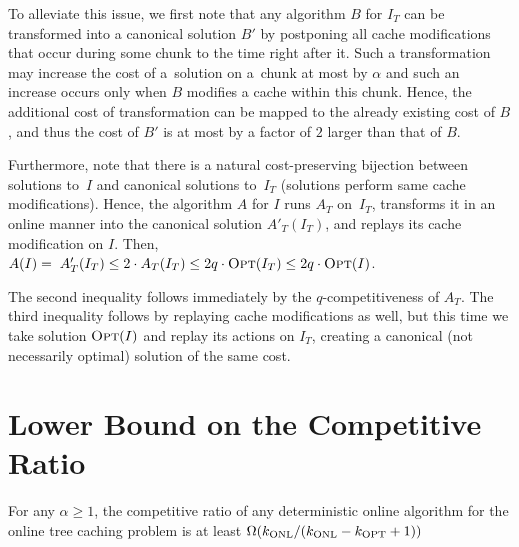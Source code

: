 To alleviate this issue, we first note that any algorithm $B$ for $I_T$ can be
transformed into a canonical solution $B'$ by postponing all cache modifications
that occur during some chunk to the time right after it. Such a transformation
may increase the cost of a~solution on a~chunk at most by $\alpha$ and such an
increase occurs only when $B$ modifies a cache within this chunk. Hence, the
additional cost of transformation can be mapped to the already existing cost of
$B$, and thus the cost of $B'$ is at most by a factor of $2$ larger than that
of $B$.

Furthermore, note that there is a natural cost-pre\-serv\-ing bijection
between solutions to~$I$ and canonical solutions to~$I_T$ (solutions perform
same cache modifications). Hence, the algorithm $A$ for $I$ runs $A_T$
on~$I_T$, transforms it in an online manner into the canonical solution $A'_T(I_T)$, 
and replays its cache modification on $I$. Then, 
$A(I) = \; A'_T(I_T) \leq 2 \cdot A_T(I_T) 
\leq 2 q \cdot \textsc{Opt}(I_T) \leq 2 q \cdot \textsc{Opt}(I)$.

The second inequality follows immediately by the $q$-com\-pe\-ti\-ti\-ve\-ness
of $A_T$. The third inequality follows by replaying cache modifications as
well, but this time we take solution $\textsc{Opt}(I)$ and replay its actions on $I_T$,
creating a canonical (not necessarily optimal) solution of the same cost.



\section{Lower Bound on the Competitive Ratio}
\label{sec:lower-bound-on-the-problem}

\begin{theorem}
For any $\alpha \geq 1$, the competitive ratio of any deterministic online
algorithm for the online tree caching problem is at least
$\Omega(k_\textnormal{ONL}/(k_\textnormal{ONL}-k_\textnormal{OPT}+1))$
\end{theorem}

